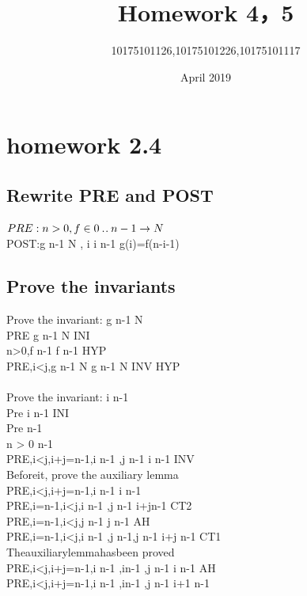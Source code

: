 \documentclass[11pt,a4paper,fleqn]{article}
\title{Homework 4，5}
\author{10175101126,10175101226,10175101117}
\date{April 2019}
\begin{document}
\maketitle

\section{ homework 2.4 }
\subsection{Rewrite PRE and POST }
\noindent
$ PRE: n > 0,f\in 0 \mathbin{.\mkern1mu.} n-1 \rightarrow N $\\
POST:g  \upto n-1 \rightarrow N , \forall i \cdot i  \upto n-1 \Rightarrow g(i)=f(n-i-1) \\



\subsection{Prove the invariants}
\noindent
Prove the invariant: g  \upto n-1 \rightarrow N \\
PRE \vdash [g:=f] g  \upto n-1 \rightarrow N \quad INI \\
n>0,f  \upto n-1 \vdash f  \upto n-1 \quad HYP \\
PRE,i<j,g  \upto n-1 \rightarrow N \vdash [g :=(\{i, j\} \domsub g) \cup\{i \mapsto g(j), j \mapsto g(i)\}]g  \upto n-1 \rightarrow N \quad INV \quad HYP\\
\noindent
\\
Prove \; the \; invariant: i  \upto n-1 \\
Pre \vdash [i:=0]i  \upto n-1 \quad INI \\
Pre   \upto n-1 \\
n > 0   \upto n-1 \quad \\
PRE,i<j,i+j=n-1,i \upto n-1 ,j \upto n-1 \vdash [i:=i+1]i \upto n-1 \; INV \\
Before\;it, \; prove \; the \; auxiliary \; lemma \; \\
PRE,i<j,i+j=n-1,i \upto n-1  \vdash i \neq n-1 \\
PRE,i=n-1,i<j,i  \upto n-1 ,j  \upto n-1 \vdash i+j\neq n-1 \;CT2 \\
PRE,i=n-1,i<j,j  \upto n-1 \vdash j  \upto n-1 \;AH \\
PRE,i=n-1,i<j,i  \upto n-1 ,j  \upto n-1,j  \upto n-1 \vdash i+j \neq n-1 \;CT1 \\
The\;auxiliary\;lemma\;has\;been\; proved \\
PRE,i<j,i+j=n-1,i \upto n-1 ,i\neq n-1 ,j \upto n-1 \vdash [i:=i+1]i \upto n-1 \; AH \\
PRE,i<j,i+j=n-1,i \upto n-1 ,i\neq n-1 ,j \upto n-1 \vdash i+1  \upto n-1 \\
\end{document}
